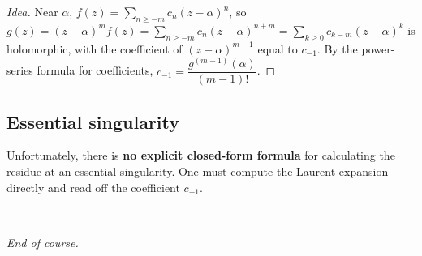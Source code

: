 \documentclass[11pt,openany]{report}
\begin{document}
\begin{proof}[Idea]
Near $\alpha$, $f(z)=\sum_{n\ge-m} c_n(z-\alpha)^n$, so
$g(z)=(z-\alpha)^m f(z)=\sum_{n\ge-m}c_n(z-\alpha)^{n+m}=\sum_{k\ge0}c_{k-m}(z-\alpha)^k$ is
holomorphic, with the coefficient of $(z-\alpha)^{m-1}$ equal to $c_{-1}$. By the
power-series formula for coefficients, $c_{-1}=\dfrac{g^{(m-1)}(\alpha)}{(m-1)!}$.
\end{proof}

\subsection{Essential singularity}
\begin{caution}
Unfortunately, there is \textbf{no explicit closed-form formula} for calculating the
residue at an essential singularity. One must compute the Laurent expansion directly and
read off the coefficient $c_{-1}$.
\end{caution}

\vspace{1em}
\begin{center}
{\color{accentblue}\rule{0.4\textwidth}{1pt}}\\[4pt]
{\itshape End of course.}
\end{center}
\end{document}

